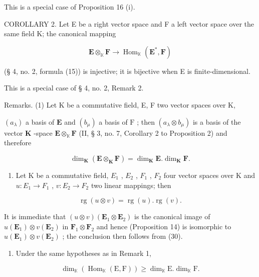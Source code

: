 This is a special case of Proposition 16 (i).

COROLLARY 2. Let E be a right vector space and F a left vector space over the same field K; the canonical mapping

\[
\mathbf {E} \otimes_ {\mathbb {K}} \mathbf {F} \rightarrow \operatorname{Hom} _ {\mathbb {K}} (\mathbf {E} ^ {*}, \mathbf {F})\tag{29}
\]

(§ 4, no. 2, formula (15)) is injective; it is bijective when E is finite-dimensional.

This is a special case of § 4, no. 2, Remark 2.

Remarks. (1) Let K be a commutative field, E, F two vector spaces over K,

\((a_{\lambda})\) a basis of \(\mathbf{E}\) and \((b_{\mu})\) a basis of \(\mathrm{F}\) ; then \((a_{\lambda} \otimes b_{\mu})\) is a basis of the vector \(\mathbf{K}\) -space \(\mathbf{E} \otimes_{\mathbb{K}} \mathbf{F}\) (II, § 3, no. 7, Corollary 2 to Proposition 2) and therefore

\[
\dim_ {\mathbf {K}} (\mathbf {E} \otimes_ {\mathbf {K}} \mathbf {F}) = \dim_ {\mathbf {K}} \mathbf {E}. \dim_ {\mathbf {K}} \mathbf {F}.\tag{30}
\]

\begin{enumerate}
\def\labelenumi{(\arabic{enumi})}
\setcounter{enumi}{1}
\tightlist
\item
  Let K be a commutative field, \(E_{1}\) , \(E_{2}\) , \(F_{1}\) , \(F_{2}\) four vector spaces over K and \(u: E_{1} \rightarrow F_{1}\) , \(v: E_{2} \rightarrow F_{2}\) two linear mappings; then
\end{enumerate}

\[
\operatorname{rg} (u \otimes v) = \operatorname{rg} (u). \operatorname{rg} (v).\tag{31}
\]

It is immediate that \((u\otimes v)(\mathbf{E}_1\otimes \mathbf{E}_2)\) is the canonical image of \(u(\mathbf{E}_1)\otimes v(\mathbf{E}_2)\) in \(\mathbf{F}_1\otimes \mathbf{F}_2\) and hence (Proposition 14) is isomorphic to \(u(\mathbf{E}_1)\otimes v(\mathbf{E}_2)\) ; the conclusion then follows from (30).

\begin{enumerate}
\def\labelenumi{(\arabic{enumi})}
\setcounter{enumi}{2}
\tightlist
\item
  Under the same hypotheses as in Remark 1,
\end{enumerate}

\[
\dim_ {\mathbb {K}} (\operatorname{Hom} _ {\mathbb {K}} (\mathrm{E}, \mathrm{F})) \geqslant \dim_ {\mathbb {K}} \mathrm{E}. \dim_ {\mathbb {K}} \mathrm{F}.\tag{32}
\]

